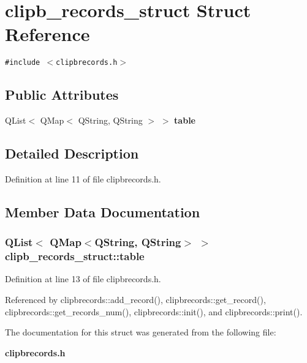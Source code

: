 \section{clipb\_\-records\_\-struct Struct Reference}
\label{structclipb__records__struct}
{\tt \#include $<$clipbrecords.h$>$}

\subsection*{Public Attributes}
\begin{CompactItemize}
\item 
QList$<$ QMap$<$ QString, QString $>$ $>$ {\bf table}
\end{CompactItemize}


\subsection{Detailed Description}




Definition at line 11 of file clipbrecords.h.

\subsection{Member Data Documentation}
\subsubsection{\setlength{\rightskip}{0pt plus 5cm}QList$<$ QMap$<$QString, QString$>$ $>$ {\bf clipb\_\-records\_\-struct::table}}\label{structclipb__records__struct_c764fcead11e88892a6e513721cc3689}




Definition at line 13 of file clipbrecords.h.

Referenced by clipbrecords::add\_\-record(), clipbrecords::get\_\-record(), clipbrecords::get\_\-records\_\-num(), clipbrecords::init(), and clipbrecords::print().

The documentation for this struct was generated from the following file:\begin{CompactItemize}
\item 
{\bf clipbrecords.h}\end{CompactItemize}
